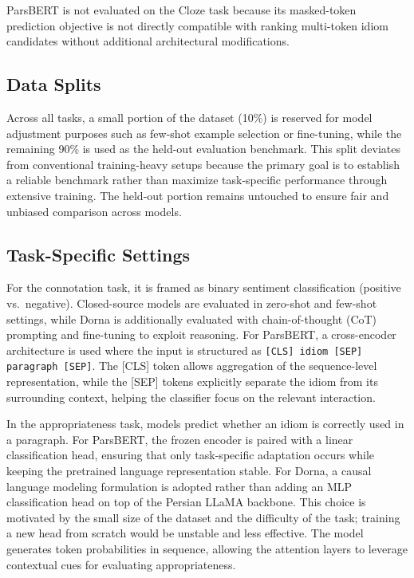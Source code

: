 \documentclass[11pt,a4paper]{article}
\begin{document}
ParsBERT is not evaluated on the Cloze task because its masked-token prediction objective is not directly compatible with ranking multi-token idiom candidates without additional architectural modifications.

\subsection{Data Splits}
Across all tasks, a small portion of the dataset (10\%) is reserved for model adjustment purposes such as few-shot example selection or fine-tuning, while the remaining 90\% is used as the held-out evaluation benchmark. This split deviates from conventional training-heavy setups because the primary goal is to establish a reliable benchmark rather than maximize task-specific performance through extensive training. The held-out portion remains untouched to ensure fair and unbiased comparison across models.

\subsection{Task-Specific Settings}
For the connotation task, it is framed as binary sentiment classification (positive vs.\ negative). Closed-source models are evaluated in zero-shot and few-shot settings, while Dorna is additionally evaluated with chain-of-thought (CoT) prompting and fine-tuning to exploit reasoning. For ParsBERT, a cross-encoder architecture is used where the input is structured as \texttt{[CLS] idiom [SEP] paragraph [SEP]}. The [CLS] token allows aggregation of the sequence-level representation, while the [SEP] tokens explicitly separate the idiom from its surrounding context, helping the classifier focus on the relevant interaction.

In the appropriateness task, models predict whether an idiom is correctly used in a paragraph. For ParsBERT, the frozen encoder is paired with a linear classification head, ensuring that only task-specific adaptation occurs while keeping the pretrained language representation stable. For Dorna, a causal language modeling formulation is adopted rather than adding an MLP classification head on top of the Persian LLaMA backbone. This choice is motivated by the small size of the dataset and the difficulty of the task; training a new head from scratch would be unstable and less effective. The model generates token probabilities in sequence, allowing the attention layers to leverage contextual cues for evaluating appropriateness.
\end{document}
